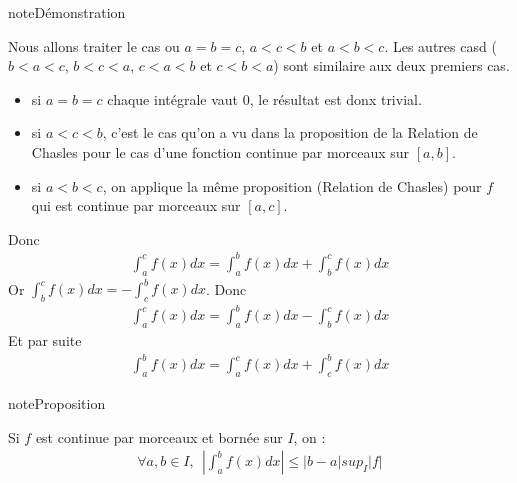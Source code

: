 \documentclass[letterpaper,10pt,french]{jupyterBook}
\begin{document}
\begin{sphinxadmonition}{note}{Démonstration}

\sphinxAtStartPar
Nous allons traiter le cas ou \(a=b=c\), \(a<c<b\) et \(a<b<c\). Les autres casd (\(b<a<c\), \(b<c<a\), \(c<a<b\) et \(c<b<a\)) sont similaire aux deux premiers cas.
\begin{itemize}
\item {} 
\sphinxAtStartPar
si \(a=b=c\) chaque intégrale vaut 0, le résultat est donx trivial.

\item {} 
\sphinxAtStartPar
si \(a<c<b\), c’est le cas qu’on a vu dans la proposition de la Relation de Chasles pour le cas d’une fonction continue par morceaux sur \([a, b]\).

\item {} 
\sphinxAtStartPar
si \(a<b<c\), on applique la même proposition (Relation de Chasles) pour \(f\) qui est continue par morceaux sur  \([a, c]\).

\end{itemize}

\sphinxAtStartPar
Donc
\begin{equation*}
\begin{split}
\int_a^c f(x)dx = \int_a^b f(x)dx + \int_b^c f(x)dx
\end{split}
\end{equation*}
\sphinxAtStartPar
Or \(\int_b^c f(x)dx = - \int_c^b f(x)dx\). Donc
\begin{equation*}
\begin{split}
\int_a^c f(x)dx = \int_a^b f(x)dx - \int_b^c f(x)dx
\end{split}
\end{equation*}
\sphinxAtStartPar
Et par suite
\begin{equation*}
\begin{split}
\int_a^b f(x)dx = \int_a^c f(x)dx + \int_c^b f(x)dx
\end{split}
\end{equation*}\end{sphinxadmonition}

\begin{sphinxadmonition}{note}{Proposition}

\sphinxAtStartPar
Si \(f\) est continue par morceaux et bornée sur \(I\), on :
\begin{equation*}
\begin{split}
\forall a, b \in I, ~~ \left|\int_a^b f(x)dx\right| \leq |b-a| sup_{I} |f|
\end{split}
\end{equation*}\end{sphinxadmonition}
\end{document}
